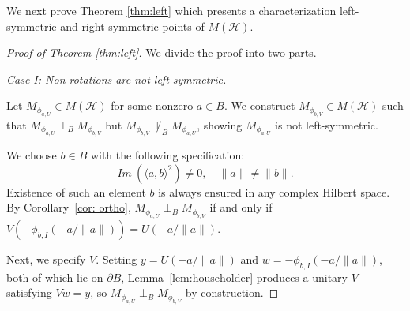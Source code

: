 \documentclass[12pt]{amsart}
\theoremstyle{definition}
\renewcommand{\H}{\mathcal{H}}
\begin{document}
\noindent We next prove Theorem \ref{thm:left} which presents a characterization left-symmetric and right-symmetric points of $M(\H)$.


\begin{proof}[Proof of Theorem \ref{thm:left}]
We divide the proof into two parts.

\medskip




\medskip


\noindent \textit{Case I: Non-rotations are not left-symmetric.}


\medskip



\noindent Let $M_{\phi_{a,U}} \in M(\mathcal{H})$ 
for some nonzero $a \in B$. We construct 
$M_{\phi_{b,V}} \in M(\mathcal{H})$ such that $M_{\phi_{a,U}} \perp_B M_{\phi_{b,V}}$ 
but $M_{\phi_{b,V}} \not\perp_B M_{\phi_{a,U}}$, showing $M_{\phi_{a,U}}$ is not 
left-symmetric.

\medskip

\noindent We choose $b \in B$ with the following specification:
\[
Im~(\langle a, b\rangle^2)\neq 0, \quad \|a\|\neq \|b\|.
\]
Existence of such an element $b$ is always ensured in any complex Hilbert space. By Corollary~\ref{cor: ortho}, $M_{\phi_{a,U}} \perp_B M_{\phi_{b,V}}$ 
if and only if $V\!\left(-\phi_{b,I}\!\left(-a/\|a\|\right)
\right) = U\!\left(-a/\|a\|\right)$.

\medskip

\noindent Next, we specify $V$. Setting 
$y = U\!\left(-a/\|a\|\right)$ and 
$w = -\phi_{b,I}\!\left(-a/\|a\|\right)$, both of which 
lie on $\partial B$, Lemma~\ref{lem:householder} produces a 
unitary $V$ satisfying $Vw = y$, so $M_{\phi_{a,U}} \perp_B M_{\phi_{b,V}}$ 
by construction. 


\medskip





\end{proof}
\end{document}
